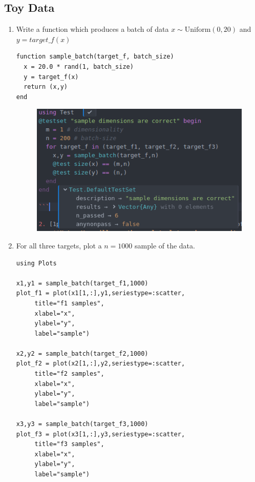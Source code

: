 \documentclass[12pt,letter]{article}
\begin{document}
\pagebreak

\subsection{Toy Data}

\begin{enumerate}
\item Write a function which produces a batch of data $x \sim \text{Uniform}(0,20)$ and $y = target\_f(x)$
\begin{verbatim}
function sample_batch(target_f, batch_size)
  x = 20.0 * rand(1, batch_size)
  y = target_f(x)
  return (x,y)
end
\end{verbatim}
  
  \begin{figure}[h]
    \centering
    \includegraphics[width=13cm,keepaspectratio]{imgs/test1.png}
  \end{figure}
  
\item For all three targets, plot a $n=1000$ sample of the data.
\begin{verbatim}
using Plots

x1,y1 = sample_batch(target_f1,1000)
plot_f1 = plot(x1[1,:],y1,seriestype=:scatter,
     title="f1 samples",
     xlabel="x",
     ylabel="y",
     label="sample")

x2,y2 = sample_batch(target_f2,1000)
plot_f2 = plot(x2[1,:],y2,seriestype=:scatter,
     title="f2 samples",
     xlabel="x",
     ylabel="y",
     label="sample")

x3,y3 = sample_batch(target_f3,1000)
plot_f3 = plot(x3[1,:],y3,seriestype=:scatter,
     title="f3 samples",
     xlabel="x",
     ylabel="y",
     label="sample")
\end{verbatim}


\end{enumerate}
\end{document}
